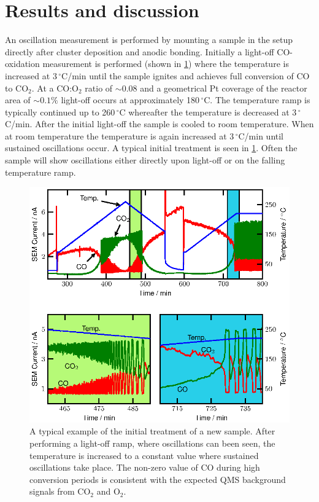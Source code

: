 \documentclass[journal=jacsat,manuscript=article]{achemso}
\begin{document}
\section{Results and discussion}
An oscillation measurement is performed by mounting a sample in the setup
directly after cluster deposition and anodic bonding. Initially a light-off
CO-oxidation measurement is performed (shown in \ref{fgr:initial_treatment}) where
the temperature is increased at 3\,$^\circ$C/min until the sample ignites and
achieves full conversion of CO to CO$_2$. At a CO:O$_2$ ratio of $\sim0.08$ and a
geometrical Pt coverage of the reactor area of $\sim0.1\%$ light-off occurs at approximately
180\,$^\circ$C. The temperature ramp is typically continued up to
260\,$^\circ$C whereafter the temperature is decreased at 3\,$^\circ$C/min.
After the initial light-off the sample is cooled to room
temperature. When at room temperature the temperature is again increased at
3\,$^\circ$C/min until sustained oscillations occur. A typical initial
treatment is seen in \ref{fgr:initial_treatment}. Often the sample will
show oscillations either directly upon light-off or on the falling temperature
ramp.

\begin{figure}
  \includegraphics[width=12cm]{initial_treatment.eps} 
  \caption{A typical example of the initial treatment of a new sample. After
  performing a light-off ramp, where oscillations can been seen, the temperature
  is increased to a constant value where sustained oscillations take place. The
  non-zero value of CO during high conversion periods is consistent with the
  expected QMS background signals from CO$_2$ and O$_2$.}
  \label{fgr:initial_treatment}
\end{figure}
\end{document}
